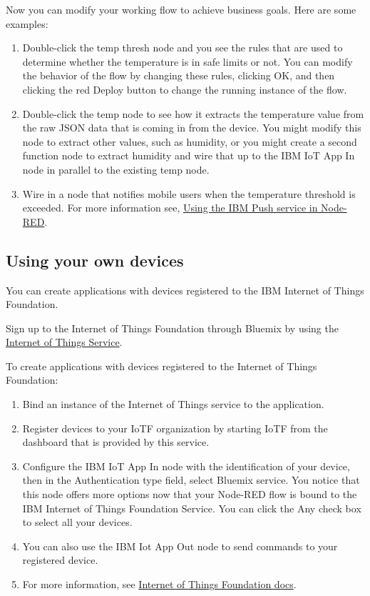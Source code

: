 \documentclass[]{book}
\begin{document}
Now you can modify your working flow to achieve business goals. Here are some examples:
\begin{enumerate}
\item Double-click the temp thresh node and you see the rules that are used to determine whether the temperature is in safe limits or not. You can modify the behavior of the flow by changing these rules, clicking OK, and then clicking the red Deploy button to change the running instance of the flow.
\item Double-click the temp node to see how it extracts the temperature value from the raw JSON data that is coming in from the device. You might modify this node to extract other values, such as humidity, or you might create a second function node to extract humidity and wire that up to the IBM IoT App In node in parallel to the existing temp node.
\item Wire in a node that notifies mobile users when the temperature threshold is exceeded. For more information see, \href{https://www.ng.bluemix.net/docs/services/IoT/index.html#iot130}{Using the IBM Push service in Node-RED}.
\end{enumerate}

\subsection{Using your own devices}
You can create applications with devices registered to the IBM Internet of Things Foundation.

Sign up to the Internet of Things Foundation through Bluemix by using the \href{https://www.ng.bluemix.net/docs/services/IoT/index.html#gettingstartedtemplate}{Internet of Things Service}.

To create applications with devices registered to the Internet of Things Foundation:

\begin{enumerate}
\item Bind an instance of the Internet of Things service to the application.
\item Register devices to your IoTF organization by starting IoTF from the dashboard that is provided by this service.
\item Configure the IBM IoT App In node with the identification of your device, then in the Authentication type field, select Bluemix service. You notice that this node offers more options now that your Node-RED flow is bound to the IBM Internet of Things Foundation Service. You can click the Any check box to select all your devices.
\item You can also use the IBM Iot App Out node to send commands to your registered device.
\item For more information, see \href{https://internetofthings.ibmcloud.com/#/}{Internet of Things Foundation docs}.
\end{enumerate}
\end{document}
